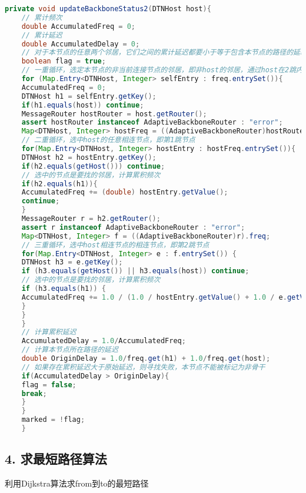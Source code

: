 \documentclass[lang=cn,11pt]{elegantpaper}
\begin{document}
	\begin{lstlisting}[language=Java]
	private void updateBackboneStatus2(DTNHost host){
	// 累计频次
	double AccumulatedFreq = 0;
	// 累计延迟
	double AccumulatedDelay = 0;
	// 对于本节点的任意两个邻居，它们之间的累计延迟都要小于等于包含本节点的路径的延时，才能将本节点置为非骨干节点，否则它就是骨干
	boolean flag = true;
	// 一重循环，选定本节点的非当前连接节点的邻居，即非host的邻居，通过host在2跳内找到该邻居
	for (Map.Entry<DTNHost, Integer> selfEntry : freq.entrySet()){
	AccumulatedFreq = 0;
	DTNHost h1 = selfEntry.getKey();
	if(h1.equals(host)) continue;
	MessageRouter hostRouter = host.getRouter();
	assert hostRouter instanceof AdaptiveBackboneRouter : "error";
	Map<DTNHost, Integer> hostFreq = ((AdaptiveBackboneRouter)hostRouter).freq;
	// 二重循环，选中host的任意相连节点，即第1跳节点
	for(Map.Entry<DTNHost, Integer> hostEntry : hostFreq.entrySet()){
	DTNHost h2 = hostEntry.getKey();
	if(h2.equals(getHost())) continue;
	// 选中的节点是要找的邻居，计算累积频次
	if(h2.equals(h1)){
	AccumulatedFreq += (double) hostEntry.getValue();
	continue;
	}
	MessageRouter r = h2.getRouter();
	assert r instanceof AdaptiveBackboneRouter : "error";
	Map<DTNHost, Integer> f = ((AdaptiveBackboneRouter)r).freq;
	// 三重循环，选中host相连节点的相连节点，即第2跳节点
	for(Map.Entry<DTNHost, Integer> e : f.entrySet()) {
	DTNHost h3 = e.getKey();
	if (h3.equals(getHost()) || h3.equals(host)) continue;
	// 选中的节点是要找的邻居，计算累积频次
	if (h3.equals(h1)) {
	AccumulatedFreq += 1.0 / (1.0 / hostEntry.getValue() + 1.0 / e.getValue());
	}
	}
	}
	// 计算累积延迟
	AccumulatedDelay = 1.0/AccumulatedFreq;
	// 计算本节点所在路径的延迟
	double OriginDelay = 1.0/freq.get(h1) + 1.0/freq.get(host);
	// 如果存在累积延迟大于原始延迟，则寻找失败，本节点不能被标记为非骨干
	if(AccumulatedDelay > OriginDelay){
	flag = false;
	break;
	}
	}
	marked = !flag;
	}
	\end{lstlisting}
	
	\subsection*{4. 求最短路径算法}
	
	利用Dijkstra算法求from到to的最短路径
	
\end{document}
